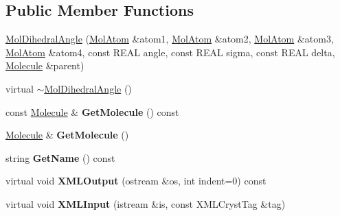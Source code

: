 \subsection*{Public Member Functions}
\begin{DoxyCompactItemize}
\item 
\mbox{\hyperlink{class_obj_cryst_1_1_mol_dihedral_angle_abae4150558beac4a71498f471c22465e}{Mol\+Dihedral\+Angle}} (\mbox{\hyperlink{class_obj_cryst_1_1_mol_atom}{Mol\+Atom}} \&atom1, \mbox{\hyperlink{class_obj_cryst_1_1_mol_atom}{Mol\+Atom}} \&atom2, \mbox{\hyperlink{class_obj_cryst_1_1_mol_atom}{Mol\+Atom}} \&atom3, \mbox{\hyperlink{class_obj_cryst_1_1_mol_atom}{Mol\+Atom}} \&atom4, const R\+E\+AL angle, const R\+E\+AL sigma, const R\+E\+AL delta, \mbox{\hyperlink{class_obj_cryst_1_1_molecule}{Molecule}} \&parent)
\item 
virtual \mbox{\hyperlink{class_obj_cryst_1_1_mol_dihedral_angle_a82685f5d7c3f96a006daaf5c691b84cc}{$\sim$\+Mol\+Dihedral\+Angle}} ()
\item 
\mbox{\label{class_obj_cryst_1_1_mol_dihedral_angle_af2d29fa7cbf4e22ba133d77ef87f8cfe}} 
const \mbox{\hyperlink{class_obj_cryst_1_1_molecule}{Molecule}} \& {\bfseries Get\+Molecule} () const
\item 
\mbox{\label{class_obj_cryst_1_1_mol_dihedral_angle_ae57e9465e7f56ad9d2984d5587372db0}} 
\mbox{\hyperlink{class_obj_cryst_1_1_molecule}{Molecule}} \& {\bfseries Get\+Molecule} ()
\item 
\mbox{\label{class_obj_cryst_1_1_mol_dihedral_angle_a84067f909e2d64ba0e84bcbda9895a1f}} 
string {\bfseries Get\+Name} () const
\item 
\mbox{\label{class_obj_cryst_1_1_mol_dihedral_angle_a9f270e07e8a72fe71700d5a40d79d658}} 
virtual void {\bfseries X\+M\+L\+Output} (ostream \&os, int indent=0) const
\item 
\mbox{\label{class_obj_cryst_1_1_mol_dihedral_angle_a162da788b851f483a0ad52e8d0e99026}} 
virtual void {\bfseries X\+M\+L\+Input} (istream \&is, const X\+M\+L\+Cryst\+Tag \&tag)
\item 
\mbox{\label{class_obj_cryst_1_1_mol_dihedral_angle_ae68208b5df1c3e6232f5226d63f22dde}} 

\end{DoxyCompactItemize}
